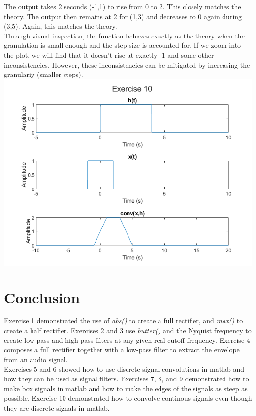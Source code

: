 \documentclass[11pt]{article}
\begin{document}
The output takes 2 seconds (-1,1) to rise from 0 to 2.
This closely matches the theory.
The output then remains at 2 for (1,3) and decreases to 0 again during (3,5).
Again, this matches the theory.\\

Through visual inspection, the function behaves exactly as the theory when the granulation is small enough and the step size is accounted for.
If we zoom into the plot, we will find that it doesn't rise at exactly -1 and some other inconsistencies.
However, these inconsistencies can be mitigated by increasing the granulariy (smaller steps).\\ 



\includegraphics[width=\textwidth]{exercise10.png}

\section{Conclusion}

Exercise 1 demonstrated the use of \textit{abs()} to create a full rectifier, and \textit{max()} to create a half rectifier.
Exercises 2 and 3 use \textit{butter()} and the Nyquist frequency to create low-pass and high-pass filters at any given real cutoff frequency.
Exercise 4 composes a full rectifier together with a low-pass filter to extract the envelope from an audio signal.\\

Exercises 5 and 6 showed how to use discrete signal convolutions in matlab and how they can be used as signal filters.
Exercises 7, 8, and 9 demonstrated how to make box signals in matlab and how to make the edges of the signals as steep as possible.
Exercise 10 demonstrated how to convolve continous signals even though they are discrete signals in matlab.\\
\end{document}
